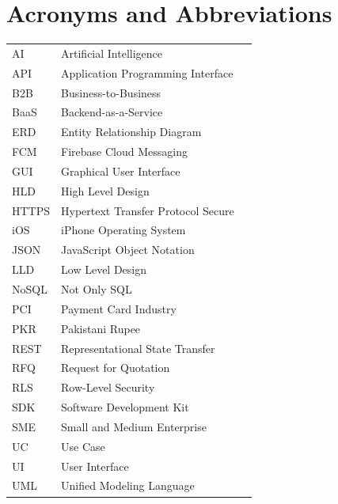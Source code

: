 \chapter*{Acronyms and Abbreviations}

\begin{flushleft}
\begin{tabular}{l p{0.8\linewidth}}
AI & Artificial Intelligence\\
API & Application Programming Interface\\
B2B & Business-to-Business\\
BaaS & Backend-as-a-Service\\
ERD & Entity Relationship Diagram\\
FCM & Firebase Cloud Messaging\\
GUI & Graphical User Interface\\
HLD & High Level Design\\
HTTPS & Hypertext Transfer Protocol Secure\\
iOS & iPhone Operating System\\
JSON & JavaScript Object Notation\\
LLD & Low Level Design\\
NoSQL & Not Only SQL\\
PCI & Payment Card Industry\\
PKR & Pakistani Rupee\\
REST & Representational State Transfer\\
RFQ & Request for Quotation\\
RLS & Row-Level Security\\
SDK & Software Development Kit\\
SME & Small and Medium Enterprise\\
UC & Use Case\\
UI & User Interface\\
UML & Unified Modeling Language\\

\end{tabular}
\end{flushleft}